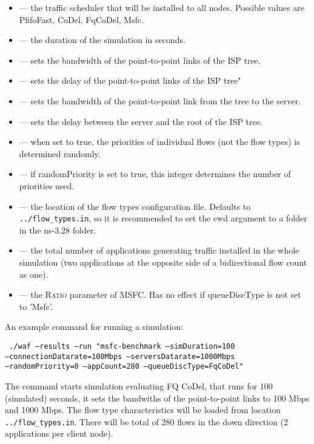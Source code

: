 \begin{itemize}
	\item {} --- the traffic scheduler that will be installed to all nodes. Possible values are PfifoFast, CoDel, FqCoDel, Msfc.
	\item {} --- the duration of the simulation in seconds.
	\item {} --- sets the bandwidth of the point-to-point links of the ISP tree.
	\item {} --- sets the delay of the point-to-point links of the ISP tree"
	\item {} --- sets the bandwidth of the point-to-point link from the tree to the server.
	\item {} --- sets the delay between the server and the root of the ISP tree.
	\item {} --- when set to true, the priorities of individual flows (not the flow types) is determined randomly.
	\item {} --- if randomPriority is set to true, this integer determines the number of priorities used.
	\item {} --- the location of the flow types configuration file. Defaults to \texttt{\small ../flow\_types.in}, so it is recommended to set the cwd argument to a folder in the ns-3.28 folder.
	\item {} --- the total number of applications generating traffic installed in the whole simulation (two applications at the opposite side of a bidirectional flow count as one).
	\item {} --- the \textsc{Ratio} parameter of MSFC. Has no effect if queueDiscType is not set to 'Msfc'.
\end{itemize}

An example command for running a simulation:

\vspace{3mm}
\texttt{\small
./waf --results --run "msfc-benchmark --simDuration=100 \\ --connectionDatarate=100Mbps --serversDatarate=1000Mbps \\ --randomPriority=0 --appCount=280 --queueDiscType=FqCoDel"
}
\vspace{3mm}

The command starts simulation evaluating FQ CoDel, that runs for 100 (simulated) seconds, it sets the bandwiths of the point-to-point links to 100 Mbps and 1000 Mbps. The flow type characteristics will be loaded from location \texttt{\small ../flow\_types.in}. There will be total of 280 flows in the down direction (2 applications per client node). 

